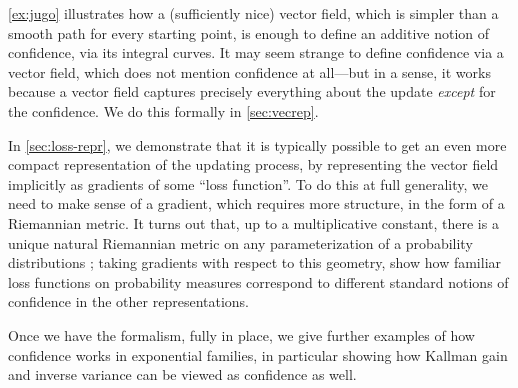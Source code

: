 \documentclass{uai2023}
\theoremstyle{plain}
\theoremstyle{definition}
\newcommand\commentout[1]{}
\begin{document}
\cref{ex:jugo} illustrates how a (sufficiently nice) vector field, 
	which is simpler than a smooth path for every starting point, is enough to define
an additive notion of confidence, via its integral curves.
It may seem strange to define confidence via a vector field, which does not mention confidence at all---but in a sense, it works because a vector field captures precisely everything about the update \emph{except} for the confidence. We do this formally in \cref{sec:vecrep}. 

In \cref{sec:loss-repr}, we demonstrate that it is typically possible to get an even more compact representation of the updating process, by representing the vector field implicitly as gradients of some ``loss function''.
To do this at full generality, we need to make sense of a gradient, which requires more structure, in the form of a Riemannian metric.  It turns out that, up to a multiplicative constant, there is a unique natural Riemannian metric on any parameterization of a probability distributions \cite{chentsov}; taking gradients with respect to this geometry, show how familiar loss functions on probability measures correspond to different standard notions of confidence in the other representations.

Once we have the formalism, fully in place, we give further examples of how confidence works in exponential families, in particular showing how Kallman gain and inverse variance can be viewed as confidence as well.



\commentout{
This general idea can be cleaned up by appeal to differential geometry.
Fix an input $\phi$.
Assuming that the update paths are differentiable in the degree of confidence at any initial beleifs, the collection of updates with infinitessimal confidence forms a complete vector field $X_\phi$ over the space of beliefs, whose integral curves are paths in belief space, parameterized by confidence $\beta \in [0,\infty]$.
We step through this more carefully in \cref{sec:field-repr}.

Finally, if our belief space is endowed with a Riemannian metric, so that we may take gradients, partial update functions may be specified by a loss.}
\end{document}
